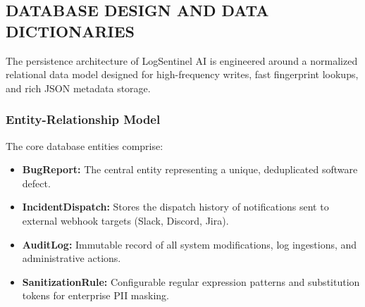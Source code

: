 \documentclass[12pt,a4paper]{article}
\begin{document}
\subsection{DATABASE DESIGN AND DATA DICTIONARIES}\label{sec:db_design}
The persistence architecture of LogSentinel AI is engineered around a normalized relational data model designed for high-frequency writes, fast fingerprint lookups, and rich JSON metadata storage.

\subsubsection{Entity-Relationship Model}
The core database entities comprise:
\begin{itemize}[leftmargin=1.2em]
    \item \textbf{BugReport:} The central entity representing a unique, deduplicated software defect.
    \item \textbf{IncidentDispatch:} Stores the dispatch history of notifications sent to external webhook targets (Slack, Discord, Jira).
    \item \textbf{AuditLog:} Immutable record of all system modifications, log ingestions, and administrative actions.
    \item \textbf{SanitizationRule:} Configurable regular expression patterns and substitution tokens for enterprise PII masking.
\end{itemize}
\end{document}
